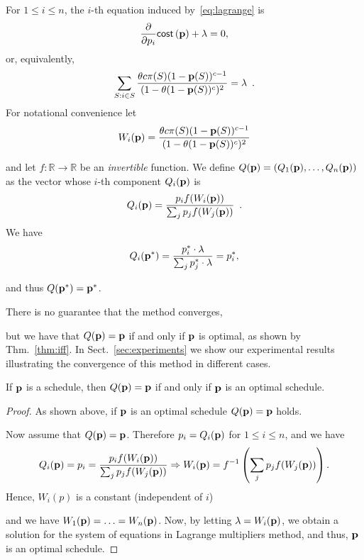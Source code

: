 For $1\le i\le n$, the $i$-th equation induced by~\eqref{eq:lagrange} is 
\[
	\frac{\partial}{\partial p_i} \mathsf{cost}\left( \mathbf{p} \right) + \lambda = 0,
\]
or, equivalently,
\[
	\sum_{S:i\in S} \frac{\theta c \pi(S)
		(1-\mathbf{p}(S))^{c-1}}{(1-\theta(1-\mathbf{p}(S))^c)^2} = \lambda\enspace.
\]
For notational convenience let 
\[
	W_i(\mathbf{p}) = \frac{\theta c \pi(S)
		(1-\mathbf{p}(S))^{c-1}}{(1-\theta(1-\mathbf{p}(S))^c)^2}
\]

and let $f: \mathbb{R} \rightarrow \mathbb{R}$ be an \emph{invertible} function.
We define $Q(\mathbf{p}) = (Q_1(\mathbf{p}), \ldots, Q_n(\mathbf{p}))$ as the vector whose $i$-th
component $Q_i(\mathbf{p})$ is
\[
	Q_i(\mathbf{p}) = \frac{p_i f(W_i(\mathbf{p}))}{\sum_{j} p_j f(W_j(\mathbf{p}))}\enspace.
\]
We have
\[
	Q_i(\mathbf{p}^*) = \frac{p^*_i\cdot \lambda}{\sum_j p^*_j\cdot \lambda} =
p^*_i,\]

and thus $Q(\mathbf{p}^*) = \mathbf{p}^*$. 

There is no guarantee that the method converges,  

but we have that $Q(\mathbf{p}) = \mathbf{p}$ if and only if $\mathbf{p}$ is optimal, as shown by
Thm.~\ref{thm:iff}. In Sect.~\ref{sec:experiments} we show our experimental
results illustrating the convergence of this method in different cases.

\begin{theorem}\label{thm:iff}
	If $\mathbf{p}$ is a schedule, then $Q(\mathbf{p}) = \mathbf{p}$ if and only if $\mathbf{p}$ is an optimal
	schedule.
\end{theorem}

\begin{proof}
	As shown above, if $\mathbf{p}$ is an optimal schedule $Q(\mathbf{p})=\mathbf{p}$ holds.
	
	Now assume that $Q(\mathbf{p})=\mathbf{p}$. Therefore $p_i = Q_i(\mathbf{p})$ for $1\leq i \leq n$,
	and we have
	\begin{align*}
	Q_i(\mathbf{p}) = p_i = \frac{p_i f(W_i(\mathbf{p}))}{\sum_{j} p_j f(W_j(\mathbf{p}))} 
	\Rightarrow
	W_i(\mathbf{p}) = f^{-1}\left(\sum_{j} p_j f(W_j(\mathbf{p}))\right).
	\end{align*}
	Hence, $W_i(p)$ is a constant (independent of $i$) 

	
	and we have
	$W_1(\mathbf{p})=\ldots=W_n(\mathbf{p})$. Now, by letting $\lambda = W_i(\mathbf{p})$, we obtain a
	solution for the system of equations in Lagrange multipliers method, and
	thus, $\mathbf{p}$ is an optimal schedule.
\end{proof}

